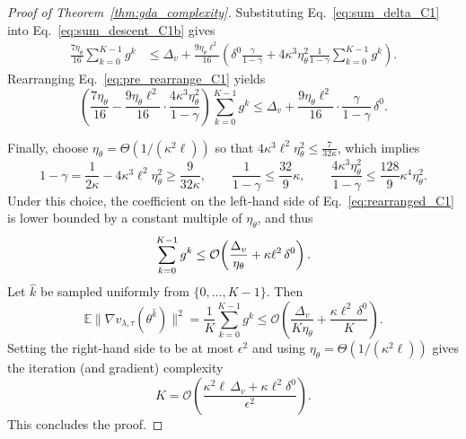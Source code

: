 \documentclass[sigconf]{acmart}
\begin{document}
\begin{proof}[Proof of Theorem~\ref{thm:gda_complexity}]
Substituting Eq.~\eqref{eq:sum_delta_C1} into Eq.~\eqref{eq:sum_descent_C1b} gives
\begin{align}
\frac{7\eta_\theta}{16}\sum_{k=0}^{K-1} g^{k}
&\le
\Delta_v
+
\frac{9\eta_\theta\ell^2}{16}
\left(
\delta^{0}\frac{\gamma}{1-\gamma}
+
4\kappa^3\eta_\theta^2\frac{1}{1-\gamma}
\sum_{k=0}^{K-1} g^{k}
\right).
\label{eq:pre_rearrange_C1}
\end{align}
Rearranging Eq.~\eqref{eq:pre_rearrange_C1} yields
\begin{equation}
\label{eq:rearranged_C1}
\left(
\frac{7\eta_\theta}{16}
-
\frac{9\eta_\theta\ell^2}{16}
\cdot
\frac{4\kappa^3\eta_\theta^2}{1-\gamma}
\right)
\sum_{k=0}^{K-1} g^{k}
\le
\Delta_v
+
\frac{9\eta_\theta\ell^2}{16}
\cdot
\frac{\gamma}{1-\gamma}\,\delta^{0}.
\end{equation}

Finally, choose $\eta_\theta=\Theta(1/(\kappa^2\ell))$ so that
$4\kappa^3\ell^2\eta_\theta^2 \le \frac{7}{32\kappa}$, which implies
\[
1-\gamma
=
\frac{1}{2\kappa}-4\kappa^3\ell^2\eta_\theta^2
\ge
\frac{9}{32\kappa},
\qquad
\frac{1}{1-\gamma}\le \frac{32}{9}\kappa,
\qquad
\frac{4\kappa^3\eta_\theta^2}{1-\gamma}\le \frac{128}{9}\kappa^4\eta_\theta^2.
\]
Under this choice, the coefficient on the left-hand side of Eq.~\eqref{eq:rearranged_C1} is lower bounded by a constant multiple of $\eta_\theta$, and thus
\begin{align}
\sum_{k=0}^{K-1} g^{k}
\le
\mathcal{O}\!\left(
\frac{\Delta_v}{\eta_\theta}
+
\kappa\ell^2\,\delta^{0}
\right)\notag.
\end{align}
Let $\widehat{k}$ be sampled uniformly from $\{0,\dots,K-1\}$. Then
\[
\mathbb{E}\bigl\|\nabla v_{\lambda,\tau}(\theta^{\widehat{k}})\bigr\|^2
=
\frac{1}{K}\sum_{k=0}^{K-1} g^{k}
\le
\mathcal{O}\!\left(
\frac{\Delta_v}{K\eta_\theta}
+
\frac{\kappa\ell^2\,\delta^{0}}{K}
\right).
\]
Setting the right-hand side to be at most $\epsilon^2$ and using
$\eta_\theta=\Theta(1/(\kappa^2\ell))$ gives the iteration (and gradient)
complexity
\[
K
=
\mathcal{O}\!\left(
\frac{\kappa^2\ell\,\Delta_v+\kappa\ell^2 \delta^{0}}{\epsilon^2}
\right).
\]
This concludes the proof.
\end{proof}
\end{document}

